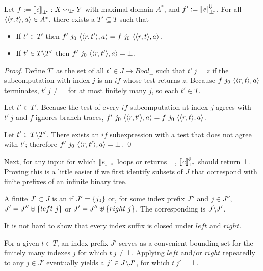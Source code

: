 \documentclass{llncs}
\newcommand{\arrow}{\rightsquigarrow}
\newcommand{\conv}{^{\mspace{-2mu}\Downarrow\mspace{-2mu}}}
\newcommand{\meaningofconv}[1]{\left\llbracket{#1}\right\rrbracket\conv}
\newcommand{\pbot}{{\bot^{\mspace{-4mu}*}}}
\DeclareMathOperator{\pbotto}{\arrow_{\mspace{-3mu}\pbot}}
\begin{document}
\begin{theorem}
Let $f := \meaningof{\mathit{e}}_\pbot : X \pbotto Y$ with maximal domain $A^*$, and $f' := \meaningofconv{\mathit{e}}_\pbot$.
For all $\langle{\langle{r,t}\rangle,a}\rangle \in A^*$, there exists a $T' \subseteq T$ such that
\begin{itemize}
	\item If $t' \in T'$ then $f'~j_0~\langle{\langle{r,t'}\rangle,a}\rangle = f~j_0~\langle{\langle{r,t}\rangle,a}\rangle$.
	\item If $t' \in T \backslash T'$ then $f'~j_0~\langle{\langle{r,t'}\rangle,a}\rangle = \bot$.
\end{itemize}
\end{theorem}
\begin{proof}
Define $T'$ as the set of all $t' \in J \to Bool_\bot$ such that $t'~j = z$ if the subcomputation with index $j$ is an $if$ whose test returns $z$.
Because $f~j_0~\langle{\langle{r,t}\rangle,a}\rangle$ terminates, $t'~j \neq \bot$ for at most finitely many $j$, so each $t' \in T$.

Let $t' \in T'$.
Because the test of every $if$ subcomputation at index $j$ agrees with $t'~j$ and $f$ ignores branch traces, $f'~j_0~\langle{\langle{r,t'}\rangle,a}\rangle = f~j_0~\langle{\langle{r,t}\rangle,a}\rangle$.

Let $t' \in T \backslash T'$.
There exists an $if$ subexpression with a test that does not agree with $t'$; therefore $f'~j_0~\langle{\langle{r,t'}\rangle,a}\rangle = \bot$.
\qed
\end{proof}

Next, for any input for which $\meaningof{\mathit{e}}_\pbot$ loops or returns $\bot$, $\meaningofconv{\mathit{e}}_\pbot$ should return $\bot$.
Proving this is a little easier if we first identify subsets of $J$ that correspond with finite prefixes of an infinite binary tree.

\begin{definition}
\label{def:index-prefix}
A finite $J' \subset J$ is an  if $J' = \{{j_0}\}$ or, for some index prefix $J''$ and $j \in J''$, $J' = J'' \uplus \{{left~j}\}$ or $J' = J'' \uplus \{{right~j}\}$.
The corresponding  is $J \backslash J'$.
\end{definition}

It is not hard to show that every index suffix is closed under $left$ and $right$.

For a given $t \in T$, an index prefix $J'$ serves as a convenient bounding set for the finitely many indexes $j$ for which $t~j \neq \bot$.
Applying $left$ and/or $right$ repeatedly to any $j \in J'$ eventually yields a $j' \in J \backslash J'$, for which $t~j' = \bot$.
\end{document}

